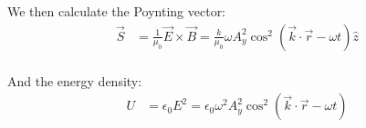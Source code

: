 \documentclass[10pt]{article} %
\begin{document}
We then calculate the Poynting vector:\\

\begin{align*}
  \vec{S} &= \frac{1}{\mu_0}\vec{E}\times\vec{B} = \frac{k}{\mu_0}\omega A_y^2\cos^2(\vec{k}\cdot\vec{r}-\omega t)\hat{z}\\
\end{align*}

And the energy density:\\

\begin{align*}
  U &= \epsilon_0 E^2 = \epsilon_0\omega^2A_y^2\cos^2(\vec{k}\cdot\vec{r}-\omega t)\\
\end{align*}
\end{document}

